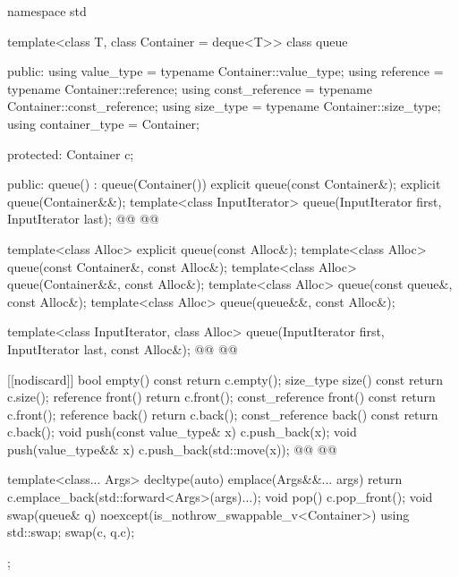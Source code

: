 \documentclass{wg21}
\begin{document}
\begin{codeblock}
namespace std {
    template<class T, class Container = deque<T>>
    class queue {
        public:
        using value_type      = typename Container::value_type;
        using reference       = typename Container::reference;
        using const_reference = typename Container::const_reference;
        using size_type       = typename Container::size_type;
        using container_type  =          Container;

        protected:
        Container c;

        public:
        queue() : queue(Container()) {}
        explicit queue(const Container&);
        explicit queue(Container&&);
        template<class InputIterator>
        queue(InputIterator first, InputIterator last);
        @@
        @@

        template<class Alloc> explicit queue(const Alloc&);
        template<class Alloc> queue(const Container&, const Alloc&);
        template<class Alloc> queue(Container&&, const Alloc&);
        template<class Alloc> queue(const queue&, const Alloc&);
        template<class Alloc> queue(queue&&, const Alloc&);

        template<class InputIterator, class Alloc>
        queue(InputIterator first, InputIterator last, const Alloc&);
        @@
        @@

        [[nodiscard]] bool empty() const    { return c.empty(); }
        size_type         size()  const     { return c.size(); }
        reference         front()           { return c.front(); }
        const_reference   front() const     { return c.front(); }
        reference         back()            { return c.back(); }
        const_reference   back() const      { return c.back(); }
        void push(const value_type& x)      { c.push_back(x); }
        void push(value_type&& x)           { c.push_back(std::move(x)); }
        @@
        @@

        template<class... Args>
        decltype(auto) emplace(Args&&... args)
        { return c.emplace_back(std::forward<Args>(args)...); }
        void pop()                          { c.pop_front(); }
        void swap(queue& q) noexcept(is_nothrow_swappable_v<Container>)
        { using std::swap; swap(c, q.c); }
    };

}
\end{codeblock}
\end{document}
